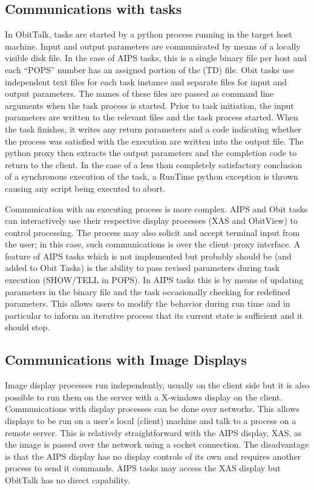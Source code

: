 \documentclass[11pt]{report}
\begin{document}
\subsection{Communications with tasks}
In ObitTalk, tasks are started by a python process running in the
target host machine.
Input and output parameters are communicated by means of a locally
visible disk file.
In the case of AIPS tasks, this is a single binary file per host and
each ``POPS'' number has an assigned portion of the (TD) file.
Obit tasks use independent text files for each task instance and
separate files for input and output parameters.
The names of these files are passed as command line arguments when the
task process is started.
Prior to task initiation, the input parameters are written to the
relevant files and the task process started.
When the task finishes, it writes any return parameters and a code
indicating whether the process was satisfied with the execution are
written into the output file.
The python proxy then extracts the output parameters and the
completion code to return to the client.
In the case of a less than completely satisfactory conclusion of a
synchronous execution of the task, a RunTime python exception is
thrown causing any script being executed to abort.

Communication with an executing process is more complex.
AIPS and Obit tasks can interactively use their respective display
processes (XAS and ObitView) to control processing.
The process may also solicit and accept terminal input from the user; in
this case, such communications is over the client--proxy interface.
A feature of AIPS tasks which is not implemented but probably should
be (and added to Obit Tasks) is the ability to pass revised parameters
during task execution (SHOW/TELL in POPS).
In AIPS tasks this is by means of updating parameters in the binary file
and the task occasionally checking for redefined parameters.
This allows users to modify the behavior during run time and in
particular to inform an iterative process that its current state is
sufficient and it should stop.

\subsection{Communications with Image Displays}
Image display processes run independently, usually on the client side
but it is also possible to run them on the server with a X-windows
display on the client.
Communications with display processes can be done over networks.
This allows displays to be run on a user's local (client) machine and
talk to a process on a remote server.
This is relatively straightforward with the AIPS display, XAS, as the
image is passed over the network using a socket connection.
The disadvantage is that the AIPS display has no display controls of
its own and requires another process to send it commands.
AIPS tasks may access the XAS display but ObitTalk has no direct
capability. 
\end{document}
